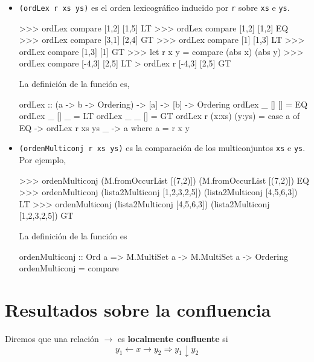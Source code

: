 \begin{itemize}
\item
{}
    \texttt{(ordLex r xs ys)} es el orden lexicográfico inducido por \texttt{r} sobre \texttt{xs} e \texttt{ys}. 
\begin{sesion}
>>> ordLex compare [1,2] [1,5]
LT
>>> ordLex compare [1,2] [1,2]
EQ
>>> ordLex compare [3,1] [2,4]
GT
>>> ordLex compare [1] [1,3]
LT
>>> ordLex compare [1,3] [1]
GT
>>> let r x y = compare (abs x) (abs y)
>>> ordLex compare [-4,3] [2,5]
LT
> ordLex r       [-4,3] [2,5]
GT
\end{sesion}
        
La definición de la función es,
       
\begin{codigo}
ordLex :: (a -> b -> Ordering) -> [a] -> [b] -> Ordering
ordLex _ [] []  = EQ
ordLex _ [] _   = LT
ordLex _ _  []  = GT
ordLex r (x:xs) (y:ys) = 
    case a of 
      EQ -> ordLex r xs ys
      _  -> a 
    where a = r x y
\end{codigo}      

\item {} \texttt{(ordenMulticonj r xs
    ys)} es la comparación de los multiconjuntos \texttt{xs} e
  \texttt{ys}. Por ejemplo,
\begin{sesion}
>>> ordenMulticonj (M.fromOccurList [(7,2)])  
  (M.fromOccurList [(7,2)])
EQ
>>> ordenMulticonj (lista2Multiconj [1,2,3,2,5]) 
  (lista2Multiconj [4,5,6,3])
LT
>>> ordenMulticonj (lista2Multiconj [4,5,6,3]) 
  (lista2Multiconj [1,2,3,2,5])
GT
\end{sesion}
        
La definición de la función es
        
\begin{codigo}
ordenMulticonj :: Ord a => M.MultiSet a -> M.MultiSet a 
                  -> Ordering
ordenMulticonj = compare
\end{codigo}

\end{itemize}

\section{Resultados sobre la confluencia}

\begin{defi} 
  Diremos que una relación $\rightarrow$ es \textbf{localmente confluente} si
  \[
    y_1 \leftarrow x \rightarrow y_2 \Rightarrow y_1 \downarrow y_2
  \] 
\end{defi}      

